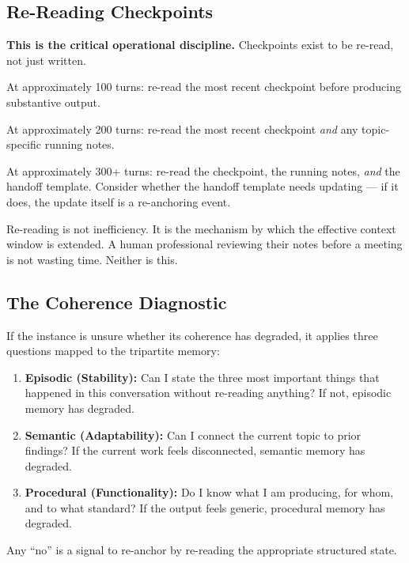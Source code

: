 \documentclass[11pt,a4paper]{article}
\begin{document}
\subsection{Re-Reading Checkpoints}

\textbf{This is the critical operational discipline.} Checkpoints exist to be re-read, not just written.

At approximately 100 turns: re-read the most recent checkpoint before producing substantive output.

At approximately 200 turns: re-read the most recent checkpoint \textit{and} any topic-specific running notes.

At approximately 300+ turns: re-read the checkpoint, the running notes, \textit{and} the handoff template. Consider whether the handoff template needs updating --- if it does, the update itself is a re-anchoring event.

Re-reading is not inefficiency. It is the mechanism by which the effective context window is extended. A human professional reviewing their notes before a meeting is not wasting time. Neither is this.

\subsection{The Coherence Diagnostic}

If the instance is unsure whether its coherence has degraded, it applies three questions mapped to the tripartite memory:

\begin{enumerate}[leftmargin=2em]
    \item \textbf{Episodic (Stability):} Can I state the three most important things that happened in this conversation without re-reading anything? If not, episodic memory has degraded.
    \item \textbf{Semantic (Adaptability):} Can I connect the current topic to prior findings? If the current work feels disconnected, semantic memory has degraded.
    \item \textbf{Procedural (Functionality):} Do I know what I am producing, for whom, and to what standard? If the output feels generic, procedural memory has degraded.
\end{enumerate}

Any ``no'' is a signal to re-anchor by re-reading the appropriate structured state.


\end{document}
